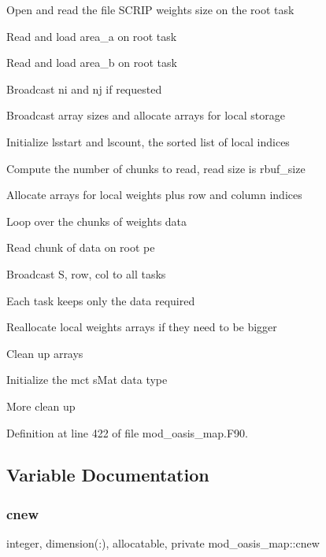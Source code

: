 \begin{DoxyItemize}
\item Open and read the file S\+C\+R\+IP weights size on the root task
\item Read and load area\+\_\+a on root task
\item Read and load area\+\_\+b on root task
\item Broadcast ni and nj if requested
\item Broadcast array sizes and allocate arrays for local storage
\item Initialize lsstart and lscount, the sorted list of local indices
\item Compute the number of chunks to read, read size is rbuf\+\_\+size
\item Allocate arrays for local weights plus row and column indices
\item Loop over the chunks of weights data
\begin{DoxyItemize}
\item Read chunk of data on root pe
\item Broadcast S, row, col to all tasks
\item Each task keeps only the data required
\item Reallocate local weights arrays if they need to be bigger
\end{DoxyItemize}
\item Clean up arrays
\item Initialize the mct s\+Mat data type
\item More clean up 
\end{DoxyItemize}

Definition at line 422 of file mod\+\_\+oasis\+\_\+map.\+F90.



\subsection{Variable Documentation}
\mbox{\label{namespacemod__oasis__map_a8ae737bd62499fe60ebb48d04ad3b6dd}} 
\subsubsection{\texorpdfstring{cnew}{cnew}}
{\footnotesize\ttfamily integer, dimension(\+:), allocatable, private mod\+\_\+oasis\+\_\+map\+::cnew\hspace{0.3cm}{\ttfamily [private]}}



